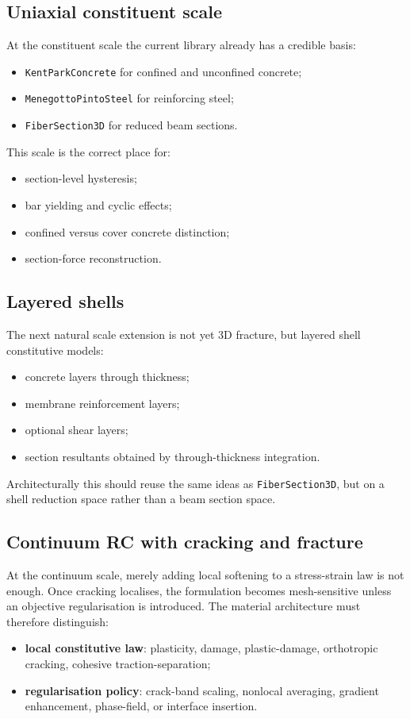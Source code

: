 \subsection{Uniaxial constituent scale}

At the constituent scale the current library already has a credible basis:
\begin{itemize}
  \item \texttt{KentParkConcrete} for confined and unconfined concrete;
  \item \texttt{MenegottoPintoSteel} for reinforcing steel;
  \item \texttt{FiberSection3D} for reduced beam sections.
\end{itemize}

This scale is the correct place for:
\begin{itemize}
  \item section-level hysteresis;
  \item bar yielding and cyclic effects;
  \item confined versus cover concrete distinction;
  \item section-force reconstruction.
\end{itemize}

\subsection{Layered shells}

The next natural scale extension is not yet 3D fracture, but layered shell
constitutive models:
\begin{itemize}
  \item concrete layers through thickness;
  \item membrane reinforcement layers;
  \item optional shear layers;
  \item section resultants obtained by through-thickness integration.
\end{itemize}

Architecturally this should reuse the same ideas as \texttt{FiberSection3D},
but on a shell reduction space rather than a beam section space.

\subsection{Continuum RC with cracking and fracture}

At the continuum scale, merely adding local softening to a stress-strain law is
not enough.  Once cracking localises, the formulation becomes mesh-sensitive
unless an objective regularisation is introduced.  The material architecture
must therefore distinguish:
\begin{itemize}
  \item \textbf{local constitutive law}: plasticity, damage, plastic-damage,
        orthotropic cracking, cohesive traction-separation;
  \item \textbf{regularisation policy}: crack-band scaling, nonlocal averaging,
        gradient enhancement, phase-field, or interface insertion.
\end{itemize}

